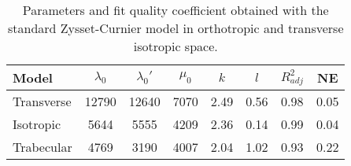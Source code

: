 \begin{table}[!h]
\centering
\caption{Parameters and fit quality coefficient obtained with the standard Zysset-Curnier model in orthotropic and transverse isotropic space.}
\label{TabZysset}
\begin{tabular}{l|c|c|c|c|c|c|c}
\toprule
     Model & $\lambda_0$ & $\lambda_0'$ & $\mu_0$ &  $k$ &  $l$ & $R^2_{adj}$ &   NE \\
\midrule
Transverse &       12790 &        12640 &    7070 & 2.49 & 0.56 &        0.98 & 0.05 \\
 Isotropic &        5644 &         5555 &    4209 & 2.36 & 0.14 &        0.99 & 0.04 \\
Trabecular &        4769 &         3190 &    4007 & 2.04 & 1.02 &        0.93 & 0.22 \\
\bottomrule
\end{tabular}
\end{table}
